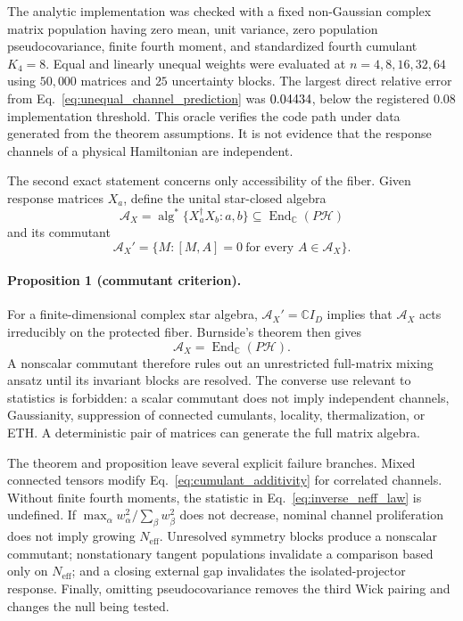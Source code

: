The analytic implementation was checked with a fixed non-Gaussian complex
matrix population having zero mean, unit variance, zero population
pseudocovariance, finite fourth moment, and standardized fourth cumulant
$K_4=8$.  Equal and linearly unequal weights were evaluated at
$n=4,8,16,32,64$ using $50{,}000$ matrices and $25$ uncertainty blocks.  The
largest direct relative error from
Eq.~\eqref{eq:unequal_channel_prediction} was $0.04434$, below the
registered $0.08$ implementation threshold.  This oracle verifies the code
path under data generated from the theorem assumptions.  It is not evidence
that the response channels of a physical Hamiltonian are independent.

The second exact statement concerns only accessibility of the fiber.
Given response matrices $X_a$, define the unital star-closed algebra
\begin{equation}
 \mathcal A_X
 =\operatorname{alg}^{*}\{X_a^\dagger X_b:a,b\}
 \subseteq\operatorname{End}_{\mathbb C}(P\mathcal H)
 \label{eq:response_algebra}
\end{equation}
and its commutant
\begin{equation}
 \mathcal A_X'
 =\{M:[M,A]=0\ \text{for every }A\in\mathcal A_X\} .
 \label{eq:response_commutant}
\end{equation}

\paragraph{Proposition 1 (commutant criterion).}
For a finite-dimensional complex star algebra,
$\mathcal A_X'=\mathbb C I_D$ implies that $\mathcal A_X$ acts irreducibly on
the protected fiber.  Burnside's theorem then gives
\begin{equation}
 \mathcal A_X=\operatorname{End}_{\mathbb C}(P\mathcal H).
 \label{eq:burnside_response}
\end{equation}
A nonscalar commutant therefore rules out an unrestricted full-matrix mixing
ansatz until its invariant blocks are resolved.  The converse use relevant
to statistics is forbidden: a scalar commutant does not imply independent
channels, Gaussianity, suppression of connected cumulants, locality,
thermalization, or ETH.  A deterministic pair of matrices can generate the
full matrix algebra.

The theorem and proposition leave several explicit failure branches.  Mixed
connected tensors modify Eq.~\eqref{eq:cumulant_additivity} for correlated
channels.  Without finite fourth moments, the statistic in
Eq.~\eqref{eq:inverse_neff_law} is undefined.  If
$\max_\alpha w_\alpha^2/\sum_\beta w_\beta^2$ does not decrease, nominal
channel proliferation does not imply growing $N_{\mathrm{eff}}$.  Unresolved
symmetry blocks produce a nonscalar commutant; nonstationary tangent
populations invalidate a comparison based only on $N_{\mathrm{eff}}$; and a
closing external gap invalidates the isolated-projector response.  Finally,
omitting pseudocovariance removes the third Wick pairing and changes the null
being tested.

